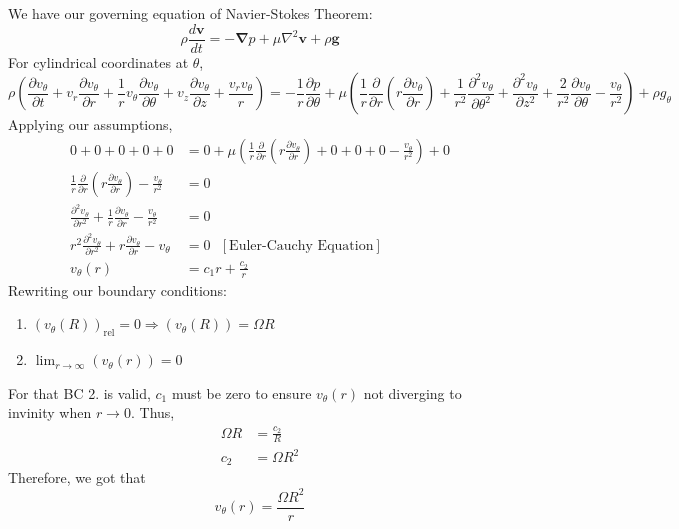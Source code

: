 \documentclass{article}
\begin{document}
We have our governing equation of Navier-Stokes Theorem:
\begin{equation}
    \rho \frac{d \mathbf{v}}{dt} = -\mathbf{\nabla}p + \mu \nabla^2 \mathbf{v} + \rho \mathbf{g}
\end{equation}
For cylindrical coordinates at $\theta$,
\begin{equation}
    \rho\left( \frac{\partial v_\theta}{\partial t} + v_r \frac{\partial v_\theta}{\partial r} + \frac{1}{r} v_\theta \frac{\partial v_\theta}{\partial \theta} + v_z \frac{\partial v_\theta}{\partial z} + \frac{v_r v_\theta}{r}\right) = -\frac{1}{r} \frac{\partial p}{\partial \theta} + \mu \left(\frac{1}{r} \frac{\partial}{\partial r}\left(r \frac{\partial v_\theta}{\partial r}\right) + \frac{1}{r^2} \frac{\partial^2 v_\theta}{\partial \theta^2} + \frac{\partial^2 v_\theta}{\partial z^2} + \frac{2}{r^2} \frac{\partial v_\theta}{\partial \theta} - \frac{v_\theta}{r^2}\right) + \rho g_\theta
\end{equation}
Applying our assumptions,
\begin{align*}
    0 + 0 + 0 + 0 + 0 &= 0 + \mu \left(\frac{1}{r} \frac{\partial}{\partial r}\left(r \frac{\partial v_\theta}{\partial r}\right) + 0 + 0 + 0 - \frac{v_\theta}{r^2}\right) + 0 \\
    \frac{1}{r} \frac{\partial}{\partial r}\left(r \frac{\partial v_\theta}{\partial r}\right) - \frac{v_\theta}{r^2} &= 0 \\
    \frac{\partial^2 v_\theta}{\partial r^2} + \frac{1}{r} \frac{\partial v_\theta}{\partial r} - \frac{v_\theta}{r^2} &= 0 \\
    r^2 \frac{\partial^2 v_\theta}{\partial r^2} + r \frac{\partial v_\theta}{\partial r} - v_\theta &= 0\hspace{8pt}\left[\textrm{Euler-Cauchy Equation}\right] \\
    v_\theta (r) &= c_1 r + \frac{c_2}{r} 
\end{align*}
Rewriting our boundary conditions:
\begin{enumerate}
    \item $(v_\theta (R))_{\textrm{rel}} = 0 \Rightarrow (v_\theta (R)) = \Omega R$
    \item $\lim_{r \rightarrow \infty} (v_\theta (r)) = 0$
\end{enumerate}
For that BC 2. is valid, $c_1$ must be zero to ensure $v_\theta (r)$ not diverging to invinity when $r \rightarrow 0$. Thus,
\begin{align*}
    \Omega R &= \frac{c_2}{R} \\
    c_2 &= \Omega R^2
\end{align*}
Therefore, we got that
\begin{equation*}
    v_\theta (r) = \frac{\Omega R^2}{r}
\end{equation*}
\end{document}
